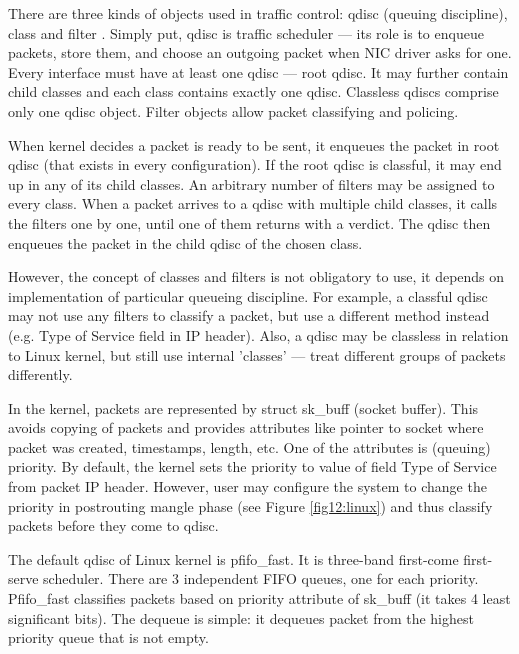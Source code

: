 
There are three kinds of objects used in traffic control: qdisc (queuing discipline), class and filter \cite{tc}. Simply put, qdisc is traffic scheduler --- its role is to enqueue packets, store them, and choose an outgoing packet when NIC driver asks for one. Every interface must have at least one qdisc --- root qdisc. It may further contain child classes and each class contains exactly one qdisc. Classless qdiscs comprise only one qdisc object. Filter objects allow packet classifying and policing.

When kernel decides a packet is ready to be sent, it enqueues the packet in root qdisc (that exists in every configuration). If the root qdisc is classful, it may end up in any of its child classes. An arbitrary number of filters may be assigned to every class. When a packet arrives to a qdisc with multiple child classes, it calls the filters one by one, until one of them returns with a verdict. The qdisc then enqueues the packet in the child qdisc of the chosen class.

However, the concept of classes and filters is not obligatory to use, it depends on implementation of particular queueing discipline. For example, a classful qdisc may not use any filters to classify a packet, but use a different method instead (e.g. Type of Service field in IP header). Also, a qdisc may be classless in relation to Linux kernel, but still use internal 'classes' --- treat different groups of packets differently.

In the kernel, packets are represented by struct sk\_buff (socket buffer). This avoids copying of packets and provides attributes like pointer to socket where packet was created, timestamps, length, etc. One of the attributes is (queuing) priority. By default, the kernel sets the priority to value of field Type of Service from packet IP header. However, user may configure the system to change the priority in postrouting mangle phase (see Figure \ref{fig12:linux}) and thus classify packets before they come to qdisc.

The default qdisc of Linux kernel is pfifo\_fast. It is three-band first-come first-serve scheduler. There are 3 independent FIFO queues, one for each priority. Pfifo\_fast classifies packets based on priority attribute of sk\_buff (it takes 4 least significant bits). The dequeue is simple: it dequeues packet from the highest priority queue that is not empty.

